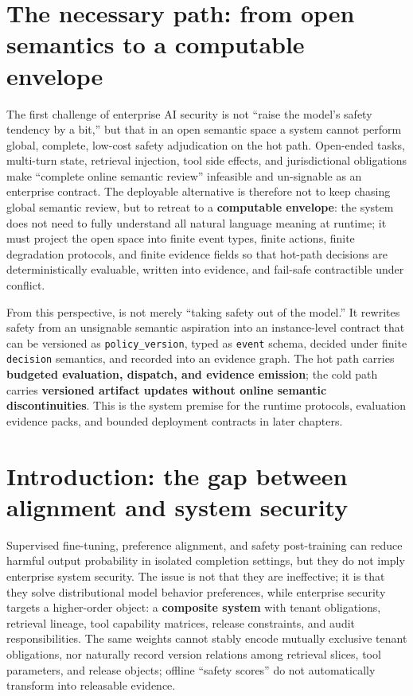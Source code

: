\documentclass[11pt,a4paper]{report}
\begin{document}
\section{The necessary path: from open semantics to a computable envelope}
The first challenge of enterprise AI security is not “raise the model’s safety tendency by a bit,” but that in an open semantic space a system cannot perform global, complete, low-cost safety adjudication on the hot path. Open-ended tasks, multi-turn state, retrieval injection, tool side effects, and jurisdictional obligations make “complete online semantic review” infeasible and un-signable as an enterprise contract. The deployable alternative is therefore not to keep chasing global semantic review, but to retreat to a \textbf{computable envelope}: the system does not need to fully understand all natural language meaning at runtime; it must project the open space into finite event types, finite actions, finite degradation protocols, and finite evidence fields so that hot-path decisions are deterministically evaluable, written into evidence, and fail-safe contractible under conflict.

From this perspective, \DecoupledSafety{} is not merely “taking safety out of the model.” It rewrites safety from an unsignable semantic aspiration into an instance-level contract that can be versioned as \texttt{policy\_version}, typed as \texttt{event} schema, decided under finite \texttt{decision} semantics, and recorded into an evidence graph. The hot path carries \textbf{budgeted evaluation, dispatch, and evidence emission}; the cold path carries \textbf{versioned artifact updates without online semantic discontinuities}. This is the system premise for the runtime protocols, evaluation evidence packs, and bounded deployment contracts in later chapters.

\section{Introduction: the gap between alignment and system security}
Supervised fine-tuning, preference alignment, and safety post-training can reduce harmful output probability in isolated completion settings, but they do not imply enterprise system security. The issue is not that they are ineffective; it is that they solve distributional model behavior preferences, while enterprise security targets a higher-order object: a \textbf{composite system} with tenant obligations, retrieval lineage, tool capability matrices, release constraints, and audit responsibilities. The same weights cannot stably encode mutually exclusive tenant obligations, nor naturally record version relations among retrieval slices, tool parameters, and release objects; offline “safety scores” do not automatically transform into releasable evidence.
\end{document}
